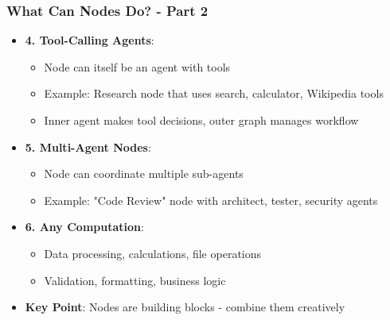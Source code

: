 \begin{frame}[fragile]\frametitle{What Can Nodes Do? - Part 2}
      \begin{itemize}
        \item \textbf{4. Tool-Calling Agents}:
        \begin{itemize}
            \item Node can itself be an agent with tools
            \item Example: Research node that uses search, calculator, Wikipedia tools
            \item Inner agent makes tool decisions, outer graph manages workflow
        \end{itemize}
        \item \textbf{5. Multi-Agent Nodes}:
        \begin{itemize}
            \item Node can coordinate multiple sub-agents
            \item Example: "Code Review" node with architect, tester, security agents
        \end{itemize}
        \item \textbf{6. Any Computation}:
        \begin{itemize}
            \item Data processing, calculations, file operations
            \item Validation, formatting, business logic
        \end{itemize}
        \item \textbf{Key Point}: Nodes are building blocks - combine them creatively
      \end{itemize}
\end{frame}

